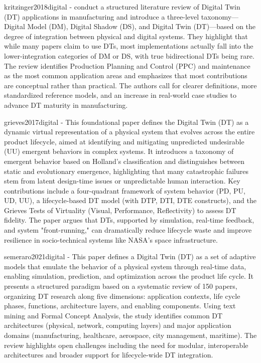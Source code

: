 kritzinger2018digital - conduct a structured literature review of Digital Twin (DT) applications in manufacturing and introduce a three-level taxonomy—Digital Model (DM), Digital Shadow (DS), and Digital Twin (DT)—based on the degree of integration between physical and digital systems. They highlight that while many papers claim to use DTs, most implementations actually fall into the lower-integration categories of DM or DS, with true bidirectional DTs being rare. The review identifies Production Planning and Control (PPC) and maintenance as the most common application areas and emphasizes that most contributions are conceptual rather than practical. The authors call for clearer definitions, more standardized reference models, and an increase in real-world case studies to advance DT maturity in manufacturing.

grieves2017digital - This foundational paper defines the Digital Twin (DT) as a dynamic virtual representation of a physical system that evolves across the entire product lifecycle, aimed at identifying and mitigating unpredicted undesirable (UU) emergent behaviors in complex systems. It introduces a taxonomy of emergent behavior based on Holland’s classification and distinguishes between static and evolutionary emergence, highlighting that many catastrophic failures stem from latent design-time issues or unpredictable human interaction. Key contributions include a four-quadrant framework of system behavior (PD, PU, UD, UU), a lifecycle-based DT model (with DTP, DTI, DTE constructs), and the Grieves Tests of Virtuality (Visual, Performance, Reflectivity) to assess DT fidelity. The paper argues that DTs, supported by simulation, real-time feedback, and system "front-running," can dramatically reduce lifecycle waste and improve resilience in socio-technical systems like NASA’s space infrastructure.


semeraro2021digital - This paper defines a Digital Twin (DT) as a set of adaptive models that emulate the behavior of a physical system through real-time data, enabling simulation, prediction, and optimization across the product life cycle. It presents a structured paradigm based on a systematic review of 150 papers, organizing DT research along five dimensions: application contexts, life cycle phases, functions, architecture layers, and enabling components. Using text mining and Formal Concept Analysis, the study identifies common DT architectures (physical, network, computing layers) and major application domains (manufacturing, healthcare, aerospace, city management, maritime). The review highlights open challenges including the need for modular, interoperable architectures and broader support for lifecycle-wide DT integration.


